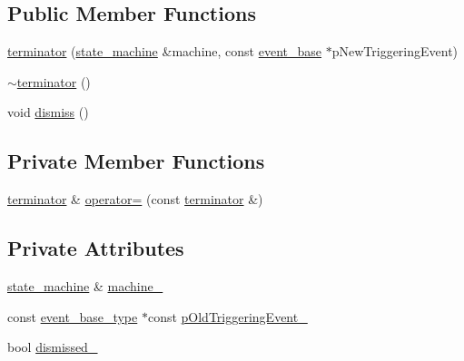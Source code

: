 \subsection*{Public Member Functions}
\begin{DoxyCompactItemize}
\item 
\mbox{\hyperlink{classboost_1_1statechart_1_1state__machine_1_1terminator_a0cf8b5013d4f8c1d39002623b9a76d1d}{terminator}} (\mbox{\hyperlink{classboost_1_1statechart_1_1state__machine}{state\+\_\+machine}} \&machine, const \mbox{\hyperlink{classboost_1_1statechart_1_1event__base}{event\+\_\+base}} $\ast$p\+New\+Triggering\+Event)
\item 
\mbox{\hyperlink{classboost_1_1statechart_1_1state__machine_1_1terminator_ab7fb7436ce00c95f86eae04e7680f07f}{$\sim$terminator}} ()
\item 
void \mbox{\hyperlink{classboost_1_1statechart_1_1state__machine_1_1terminator_abe1a2391649be5b88968d29e0fd23e87}{dismiss}} ()
\end{DoxyCompactItemize}
\subsection*{Private Member Functions}
\begin{DoxyCompactItemize}
\item 
\mbox{\hyperlink{classboost_1_1statechart_1_1state__machine_1_1terminator}{terminator}} \& \mbox{\hyperlink{classboost_1_1statechart_1_1state__machine_1_1terminator_ad2254dfe7c984a14ed5f76deab912551}{operator=}} (const \mbox{\hyperlink{classboost_1_1statechart_1_1state__machine_1_1terminator}{terminator}} \&)
\end{DoxyCompactItemize}
\subsection*{Private Attributes}
\begin{DoxyCompactItemize}
\item 
\mbox{\hyperlink{classboost_1_1statechart_1_1state__machine}{state\+\_\+machine}} \& \mbox{\hyperlink{classboost_1_1statechart_1_1state__machine_1_1terminator_abd7df485f3f9ddb47ebe9f33c272da87}{machine\+\_\+}}
\item 
const \mbox{\hyperlink{classboost_1_1statechart_1_1state__machine_adb0e98d6d780a0977209fa7389b20bcd}{event\+\_\+base\+\_\+type}} $\ast$const \mbox{\hyperlink{classboost_1_1statechart_1_1state__machine_1_1terminator_ac0daef6caf31d033aeeb43bedd491969}{p\+Old\+Triggering\+Event\+\_\+}}
\item 
bool \mbox{\hyperlink{classboost_1_1statechart_1_1state__machine_1_1terminator_a55b3acd38cd807904ef015fbf29fcc63}{dismissed\+\_\+}}
\end{DoxyCompactItemize}


